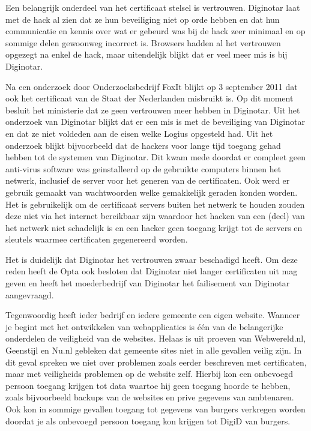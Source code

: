 Een belangrijk onderdeel van het certificaat stelsel is vertrouwen. Diginotar laat met de hack al zien dat ze hun beveiliging niet op orde hebben en dat hun communicatie en kennis over wat er gebeurd was bij de hack zeer minimaal en op sommige delen gewoonweg incorrect is. Browsers hadden al het vertrouwen opgezegt na enkel de hack, maar uitendelijk blijkt dat er veel meer mis is bij Diginotar. 

Na een onderzoek door Onderzoeksbedrijf FoxIt blijkt op 3 september 2011 dat ook het certificaat van de Staat der Nederlanden misbruikt is\cite{bib.foxit}. Op dit moment besluit het ministerie dat ze geen vertrouwen meer hebben in Diginotar\cite{bib.webwereld.diginotar4}. Uit het onderzoek van Diginotar blijkt dat er een mis is met de beveiliging van Diginotar en dat ze niet voldeden aan de eisen welke Logius opgesteld had. Uit het onderzoek blijkt bijvoorbeeld dat de hackers voor lange tijd toegang gehad hebben tot de systemen van Diginotar. Dit kwam mede doordat er compleet geen anti-virus software was geinstalleerd op de gebruikte computers binnen het netwerk, inclusief de server voor het generen van de certificaten. Ook werd er gebruik gemaakt van wachtwoorden welke gemakkelijk geraden konden worden. 
Het is gebruikelijk om de certificaat servers buiten het netwerk te houden zouden deze niet via het internet bereikbaar zijn waardoor het hacken van een (deel) van het netwerk niet schadelijk is en een hacker geen toegang krijgt tot de servers en sleutels waarmee certificaten gegenereerd worden.

Het is duidelijk dat Diginotar het vertrouwen zwaar beschadigd heeft. Om deze reden heeft de Opta ook besloten dat Diginotar niet langer certificaten uit mag geven en heeft het moederbedrijf van Diginotar het failisement van Diginotar aangevraagd.

Tegenwoordig heeft ieder bedrijf en iedere gemeente een eigen website. Wanneer je begint met het ontwikkelen van webapplicaties is \'{e}\'{e}n van de belangerijke onderdelen de veiligheid van de websites. Helaas is uit proeven van Webwereld.nl, Geenstijl en Nu.nl gebleken dat gemeente sites niet in alle gevallen veilig zijn\cite{bib.tweakers.gemeente}. In dit geval spreken we niet over problemen zoals eerder beschreven met certificaten, maar met veiligheids problemen op de website zelf. Hierbij kon een onbevoegd persoon toegang krijgen tot data waartoe hij geen toegang hoorde te hebben, zoals bijvoorbeeld backups van de websites en prive gegevens van ambtenaren. Ook kon in sommige gevallen toegang tot gegevens van burgers verkregen worden doordat je als onbevoegd persoon toegang kon krijgen tot DigiD van burgers. 

